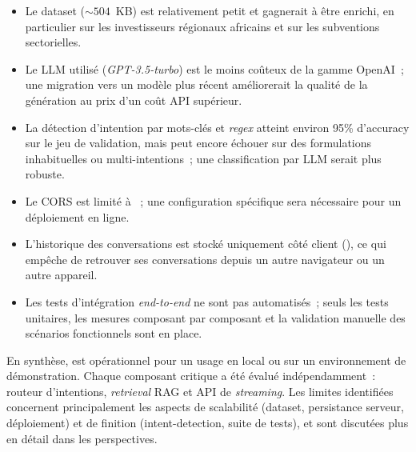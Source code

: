 \begin{itemize}
  \item Le dataset (${\sim}504$~KB) est relativement petit et gagnerait à être enrichi, en particulier sur les investisseurs régionaux africains et sur les subventions sectorielles.
  \item Le \ac{LLM} utilisé (\textit{GPT-3.5-turbo}) est le moins coûteux de la gamme OpenAI~; une migration vers un modèle plus récent améliorerait la qualité de la génération au prix d'un coût \ac{API} supérieur.
  \item La détection d'intention par mots-clés et \textit{regex} atteint environ 95\% d'accuracy sur le jeu de validation, mais peut encore échouer sur des formulations inhabituelles ou multi-intentions~; une classification par \ac{LLM} serait plus robuste.
  \item Le \ac{CORS} est limité à ~; une configuration spécifique sera nécessaire pour un déploiement en ligne.
  \item L'historique des conversations est stocké uniquement côté client (), ce qui empêche de retrouver ses conversations depuis un autre navigateur ou un autre appareil.
  \item Les tests d'intégration \textit{end-to-end} ne sont pas automatisés~; seuls les tests unitaires, les mesures composant par composant et la validation manuelle des scénarios fonctionnels sont en place.
\end{itemize}

\begin{callout}
En synthèse, \tamwil{} est opérationnel pour un usage en local ou sur un environnement de démonstration. Chaque composant critique a été évalué indépendamment~: routeur d'intentions, \textit{retrieval} \ac{RAG} et \ac{API} de \textit{streaming}. Les limites identifiées concernent principalement les aspects de scalabilité (dataset, persistance serveur, déploiement) et de finition (intent-detection, suite de tests), et sont discutées plus en détail dans les perspectives.
\end{callout}
